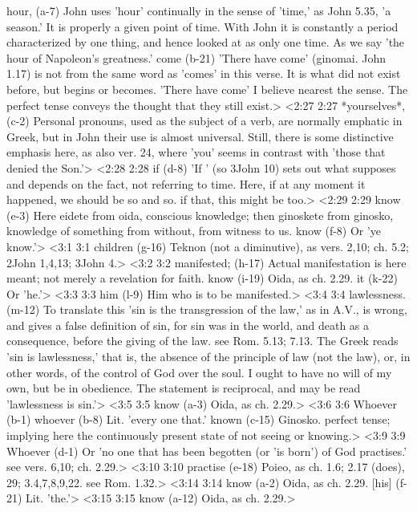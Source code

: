   hour, (a-7)  John uses 'hour' continually in the sense of 'time,' as John  5.35, 'a season.' It is properly a given point of time. With  John it is constantly a period characterized by one thing, and  hence looked at as only one time. As we say 'the hour of  Napoleon's greatness.'
  come (b-21)  'There have come' (ginomai. John 1.17) is not from the same  word as 'comes' in this verse. It is what did not exist before,  but begins or becomes. 'There have come' I believe nearest the  sense. The perfect tense conveys the thought that they still  exist.>
<2:27 2:27  *yourselves*, (c-2)  Personal pronouns, used as the subject of a verb, are  normally emphatic in Greek, but in John their use is almost  universal. Still, there is some distinctive emphasis here, as  also ver. 24, where 'you' seems in contrast with 'those that  denied the Son.'>
<2:28 2:28  if (d-8)  'If ' (so 3John 10) sets out what supposes and depends on the  fact, not referring to time. Here, if at any moment it  happened, we should be so and so. if that, this might be too.>
<2:29 2:29  know (e-3)  Here eidete from oida, conscious knowledge; then  ginoskete from ginosko, knowledge of something from  without, from witness to us.
  know (f-8)  Or 'ye know.'>
<3:1 3:1  children (g-16)  Teknon (not a diminutive), as vers. 2,10; ch. 5.2; 2John  1,4,13; 3John 4.>
<3:2 3:2  manifested; (h-17)  Actual manifestation is here meant; not merely a revelation  for faith.
  know (i-19)  Oida, as ch. 2.29.
  it (k-22)  Or 'he.'>
<3:3 3:3  him (l-9)  Him who is to be manifested.>
<3:4 3:4  lawlessness. (m-12)  To translate this 'sin is the transgression of the law,' as  in A.V., is wrong, and gives a false definition of sin, for sin  was in the world, and death as a consequence, before the giving  of the law. see Rom. 5.13; 7.13. The Greek reads 'sin is  lawlessness,' that is, the absence of the principle of law  (not the law), or, in other words, of the control of God over  the soul. I ought to have no will of my own, but be in  obedience. The statement is reciprocal, and may be read  'lawlessness is sin.'>
<3:5 3:5  know (a-3)  Oida, as ch. 2.29.>
<3:6 3:6  Whoever (b-1)  whoever (b-8)  Lit. 'every one that.'
  known (c-15)  Ginosko. perfect tense; implying here the continuously  present state of not seeing or knowing.>
<3:9 3:9  Whoever (d-1)  Or 'no one that has been begotten (or 'is born') of God  practises.' see vers. 6,10; ch. 2.29.>
<3:10 3:10  practise (e-18) Poieo, as ch. 1.6; 2.17 (does), 29; 3.4,7,8,9,22. see Rom. 1.32.>
<3:14 3:14  know (a-2)  Oida, as ch. 2.29.
  [his] (f-21)  Lit. 'the.'>
<3:15 3:15  know (a-12)  Oida, as ch. 2.29.>
